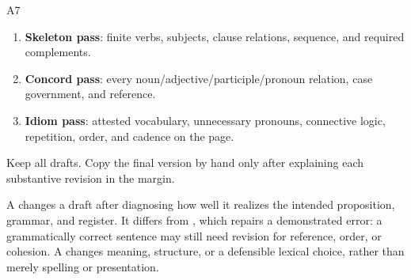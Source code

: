\begin{courseunit}{A7}
\begin{enumerate}
  \item \textbf{Skeleton pass}: finite verbs, subjects, clause relations,
        sequence, and required complements.
  \item \textbf{Concord pass}: every noun/adjective/participle/pronoun relation,
        case government, and reference.
  \item \textbf{Idiom pass}: attested vocabulary, unnecessary pronouns,
        connective logic, repetition, order, and cadence on the page.
\end{enumerate}

Keep all drafts. Copy the final version by hand only after explaining each
substantive revision in the margin.

A  changes a draft after diagnosing how well it realizes the
intended proposition, grammar, and register. It differs from ,
which repairs a demonstrated error: a grammatically correct sentence may still
need revision for reference, order, or cohesion. A 
changes meaning, structure, or a defensible lexical choice, rather than merely
spelling or presentation.



\end{courseunit}

